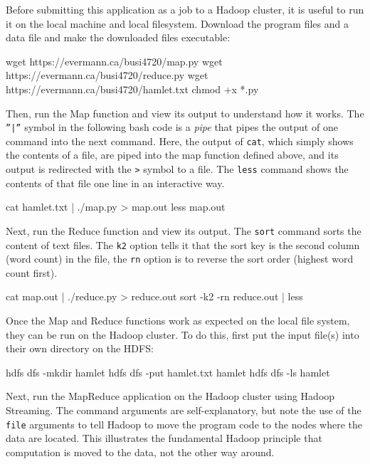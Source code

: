 \begin{withcode}
Before submitting this application as a job to a Hadoop cluster, it is useful to run it on the local machine and local filesystem. Download the program files and a data file and make the downloaded files executable:

\begin{bashcode}
wget https://evermann.ca/busi4720/map.py
wget https://evermann.ca/busi4720/reduce.py
wget https://evermann.ca/busi4720/hamlet.txt
chmod +x *.py
\end{bashcode}

Then, run the Map function and view its output to understand how it works. The \texttt{''|''} symbol in the following bash code is a \emph{pipe} that pipes the output of one command into the next command. Here, the output of \texttt{cat}, which simply shows the contents of a file, are piped into the map function defined above, and its output is redirected with the \texttt{>} symbol to a file. The \texttt{less} command shows the contents of that file one line in an interactive way.

\begin{bashcode}
cat hamlet.txt | ./map.py > map.out
less map.out
\end{bashcode}

Next, run the Reduce function and view its output. The \texttt{sort} command sorts the content of text files. The \texttt{k2} option tells it that the sort key is the second column (word count) in the file, the \texttt{rn} option is to reverse the sort order (highest word count first).

\begin{bashcode}
cat map.out | ./reduce.py > reduce.out
sort -k2 -rn reduce.out | less
\end{bashcode}

Once the Map and Reduce functions work as expected on the local file system, they can be run on the Hadoop cluster. To do this, first put the input file(s) into their own directory on the HDFS:

\begin{bashcode}
hdfs dfs -mkdir hamlet
hdfs dfs -put hamlet.txt hamlet
hdfs dfs -ls hamlet
\end{bashcode}

Next, run the MapReduce application on the Hadoop cluster using Hadoop Streaming. The command arguments are self-explanatory, but note the use of the \texttt{file} arguments to tell Hadoop to move the program code to the nodes where the data are located. This illustrates the fundamental Hadoop principle that computation is moved to the data, not the other way around.


\end{withcode}
